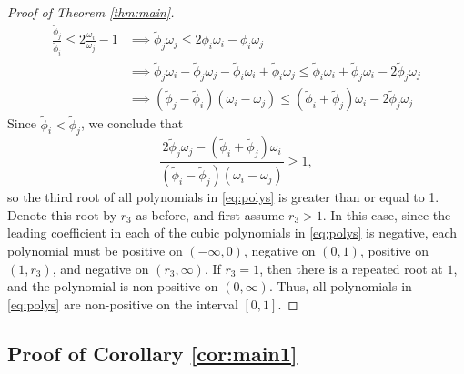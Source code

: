 \documentclass[12pt]{article}
\begin{document}
\begin{proof}[Proof of Theorem \ref{thm:main}]
\begin{equation*}
\begin{aligned}
    \frac{\tilde{\phi}_j}{\tilde{\phi}_i} \leq 2 \frac{\omega_i}{\omega_j} - 1 &\implies \tilde{\phi}_j \omega_j \leq 2 \phi_i \omega_i - \phi_i \omega_j \\
    &\implies \tilde{\phi}_j \omega_i - \tilde{\phi}_j \omega_j - \tilde{\phi}_i \omega_i + \tilde{\phi}_i \omega_j \leq \tilde{\phi}_i \omega_i + \tilde{\phi}_j \omega_i - 2\tilde{\phi}_j \omega_j \\
    &\implies (\tilde{\phi}_j - \tilde{\phi}_i)(\omega_i - \omega_j) \leq (\tilde{\phi}_i + \tilde{\phi}_j) \omega_i - 2 \tilde{\phi}_j \omega_j
\end{aligned}
\end{equation*}
Since $\tilde{\phi}_i < \tilde{\phi}_j$, we conclude that
\begin{equation*}
    \frac{2 \tilde{\phi}_j \omega_j - (\tilde{\phi}_i + \tilde{\phi}_j) \omega_i}{(\tilde{\phi}_i - \tilde{\phi}_j)(\omega_i - \omega_j)} \geq 1,
\end{equation*}
so the third root of all polynomials in \eqref{eq:polys} is greater than or equal to 1. Denote this root by $r_3$ as before, and first assume $r_3 > 1$. In this case, since the leading coefficient in each of the cubic polynomials in \eqref{eq:polys} is negative, each polynomial must be positive on $(-\infty, 0)$, negative on $(0, 1)$, positive on $(1, r_3)$, and negative on $(r_3, \infty)$. If $r_3=1$, then there is a repeated root at $1$, and the polynomial is non-positive on $(0, \infty)$. Thus, all polynomials in \eqref{eq:polys} are non-positive on the interval $[0, 1]$.
\end{proof}

\subsection{{Proof of Corollary \ref{cor:main1}}}
\end{document}
